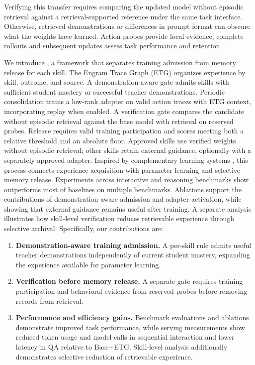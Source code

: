 Verifying this transfer requires comparing the updated model without episodic retrieval against a retrieval-supported reference under the same task interface. Otherwise, retrieved demonstrations or differences in prompt format can obscure what the weights have learned. Action probes provide local evidence; complete rollouts and subsequent updates assess task performance and retention.

We introduce \method, a framework that separates training admission from memory release for each skill. The Engram Trace Graph (ETG) organizes experience by skill, outcome, and source. A demonstration-aware gate admits skills with sufficient student mastery or successful teacher demonstrations. Periodic consolidation trains a low-rank adapter on valid action traces with ETG context, incorporating replay when enabled. A verification gate compares the candidate without episodic retrieval against the base model with retrieval on reserved probes. Release requires valid training participation and scores meeting both a relative threshold and an absolute floor. Approved skills use verified weights without episodic retrieval; other skills retain external guidance, optionally with a separately approved adapter. Inspired by complementary learning systems \citep{mcclelland1995cls}, this process connects experience acquisition with parameter learning and selective memory release. Experiments across interactive and reasoning benchmarks show \method outperforms most of baselines on multiple benchmarks. Ablations support the contributions of demonstration-aware admission and adapter activation, while showing that external guidance remains useful after training. A separate analysis illustrates how skill-level verification reduces retrievable experience through selective archival. Specifically, our contributions are:

\begin{enumerate}
\item \textbf{Demonstration-aware training admission.} A per-skill rule admits useful teacher demonstrations independently of current student mastery, expanding the experience available for parameter learning.
\item \textbf{Verification before memory release.} A separate gate requires training participation and behavioral evidence from reserved probes before removing records from retrieval.
\item \textbf{Performance and efficiency gains.} Benchmark evaluations and ablations demonstrate improved task performance, while serving measurements show reduced token usage and model calls in sequential interaction and lower latency in QA relative to Base+ETG. Skill-level analysis additionally demonstrates selective reduction of retrievable experience.
\end{enumerate}


\vspace{-8pt}
